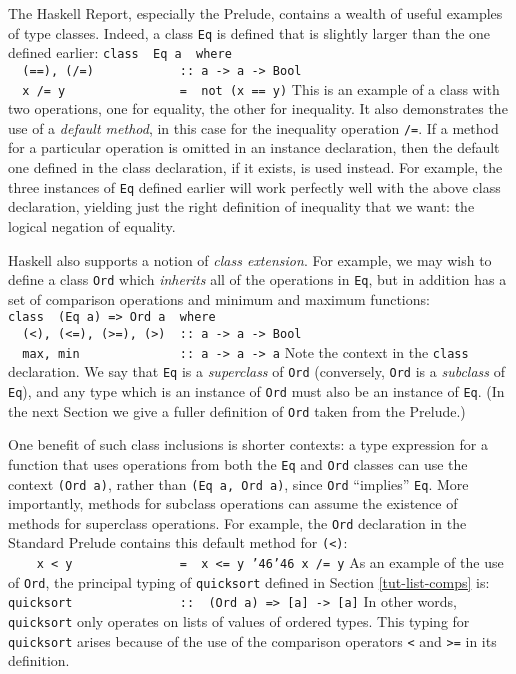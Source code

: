 The Haskell Report, especially the Prelude, contains a wealth
of useful examples of type classes.  
Indeed, a class \mbox{\tt Eq} is defined
that is slightly larger than the one defined earlier:
\bprog
\mbox{\tt class\ \ Eq\ a\ \ where}\\
\mbox{\tt \ \ (==),\ (/=)\ \ \ \ \ \ \ \ \ \ \ \ ::\ a\ ->\ a\ ->\ Bool}\\
\mbox{\tt \ \ x\ /=\ y\ \ \ \ \ \ \ \ \ \ \ \ \ \ \ \ =\ \ not\ (x\ ==\ y)}
\eprog
This is an example of a class with two operations, one for
equality, the other for inequality.  It also demonstrates the use of a
{\em default method}, in this case for the inequality operation \mbox{\tt /=}.
If a method for a particular operation is omitted in an instance
declaration, then the default one defined in the class declaration, if
it exists, is used instead.  For example, the three instances of \mbox{\tt Eq}
defined earlier will work perfectly well with the above class
declaration, yielding just the right definition of inequality that we
want: the logical negation of equality.

Haskell also supports a notion of {\em class extension}.  For example,
we may wish to define a class \mbox{\tt Ord} which {\em inherits} all of the
operations in \mbox{\tt Eq}, but in addition has a set of comparison operations
and minimum and maximum functions:
\bprog
\mbox{\tt class\ \ (Eq\ a)\ =>\ Ord\ a\ \ where}\\
\mbox{\tt \ \ (<),\ (<=),\ (>=),\ (>)\ \ ::\ a\ ->\ a\ ->\ Bool}\\
\mbox{\tt \ \ max,\ min\ \ \ \ \ \ \ \ \ \ \ \ \ \ ::\ a\ ->\ a\ ->\ a}
\eprog 
Note the context in the \mbox{\tt class} declaration.  We say that \mbox{\tt Eq} is a
{\em superclass} of \mbox{\tt Ord} (conversely, \mbox{\tt Ord} is a {\em subclass} of
\mbox{\tt Eq}), and any type which is an instance of \mbox{\tt Ord} must also be an
instance of \mbox{\tt Eq}. 
(In the next Section we give a fuller definition of \mbox{\tt Ord} taken from
the Prelude.)

One benefit of such class inclusions is shorter contexts: a type
expression for a function that uses operations from both the \mbox{\tt Eq} and
\mbox{\tt Ord} classes can use the context \mbox{\tt (Ord\ a)}, rather than 
\mbox{\tt (Eq\ a,\ Ord\ a)}, since \mbox{\tt Ord} ``implies'' \mbox{\tt Eq}.  More importantly,
methods for subclass operations can assume the existence of methods
for superclass operations.  For example, the \mbox{\tt Ord} declaration in the
Standard Prelude contains this default method for \mbox{\tt (<)}: 
\bprog
\mbox{\tt \ \ \ \ x\ <\ y\ \ \ \ \ \ \ \ \ \ \ \ \ \ \ =\ \ x\ <=\ y\ {\char'46}{\char'46}\ x\ /=\ y}
\eprog
As an example of the use of \mbox{\tt Ord}, the principal typing of \mbox{\tt quicksort}
defined in Section \ref{tut-list-comps} is:
\bprog
\mbox{\tt quicksort\ \ \ \ \ \ \ \ \ \ \ \ \ \ \ ::\ \ (Ord\ a)\ =>\ [a]\ ->\ [a]}
\eprog
In other words, \mbox{\tt quicksort} only operates on lists of values of 
ordered types.  This typing for \mbox{\tt quicksort} arises because of the use
of the comparison operators \mbox{\tt <} and \mbox{\tt >=} in its definition.

